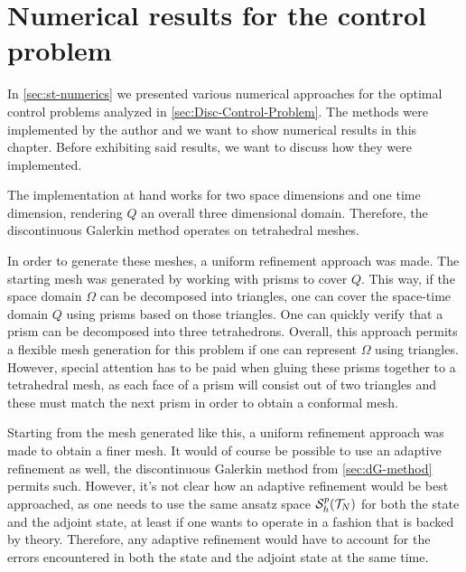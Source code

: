 \documentclass[../thesis.tex]{subfiles}
\begin{document}
\chapter{Numerical results for the control problem}
\label{sec:numerical-results}
In \cref{sec:st-numerics} we presented various numerical approaches for the optimal control problems analyzed in \cref{sec:Disc-Control-Problem}.
The methods were implemented by the author and we want to show numerical results in this chapter.
Before exhibiting said results, we want to discuss how they were implemented.

The implementation at hand works for two space dimensions and one time dimension, rendering $Q$ an overall three dimensional domain.
Therefore, the discontinuous Galerkin method operates on tetrahedral meshes.

In order to generate these meshes, a uniform refinement approach was made. The starting mesh was generated by working with prisms to cover $Q$. This way, if the space domain $\Omega$ can be decomposed into triangles, one can cover the space-time domain $Q$ using prisms based on those triangles.
One can quickly verify that a prism can be decomposed into three tetrahedrons. Overall, this approach permits a flexible mesh generation for this problem if one can represent $\Omega$ using triangles.
However, special attention has to be paid when gluing these prisms together to a tetrahedral mesh, as each face of a prism will consist out of two triangles and these must match the next prism in order to obtain a conformal mesh.

Starting from the mesh generated like this, a uniform refinement approach was made to obtain a finer mesh. It would of course be possible to use an adaptive refinement as well, the discontinuous Galerkin method from \cref{sec:dG-method} permits such.
However, it's not clear how an adaptive refinement would be best approached, as one needs to use the same ansatz space $\mathcal{S}_h^p(\mathcal{T}_N)$ for both the state and the adjoint state, at least if one wants to operate in a fashion that is backed by theory. Therefore, any adaptive refinement would have to account for the errors encountered in both the state and the adjoint state at the same time.
\end{document}
